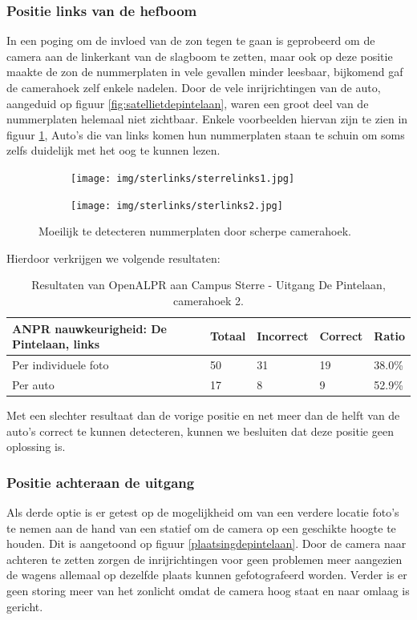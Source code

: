 \subsubsection{Positie links van de hefboom}
In een poging om de invloed van de zon tegen te gaan is geprobeerd om de camera aan de linkerkant van de slagboom te zetten, maar ook op deze positie maakte de zon de nummerplaten in vele gevallen minder leesbaar, bijkomend gaf de camerahoek zelf enkele nadelen. Door de vele inrijrichtingen van de auto, aangeduid op figuur \ref{fig:satellietdepintelaan}, waren een groot deel van de nummerplaten helemaal niet zichtbaar. Enkele voorbeelden hiervan zijn te zien in figuur \ref{fig:sterre-links}, Auto's die van links komen hun nummerplaten staan te schuin om soms zelfs duidelijk met het oog te kunnen lezen.

\begin{figure}[h!]
	\centering
	\begin{subfigure}[b]{0.4\linewidth}
		\texttt{[image: img/sterlinks/sterrelinks1.jpg]}
	\end{subfigure}
	\begin{subfigure}[b]{0.4\linewidth}
		\texttt{[image: img/sterlinks/sterlinks2.jpg]}
	\end{subfigure}
	\caption{Moeilijk te detecteren nummerplaten door scherpe camerahoek.}
	\label{fig:sterre-links}
\end{figure}

Hierdoor verkrijgen we volgende resultaten:
\begin{table}[h!]
	\centering
	\begin{tabular}{l|l|l|l|l}
		\textbf{ANPR nauwkeurigheid: De Pintelaan, links} & Totaal & Incorrect & Correct & Ratio	\\ \hline
		Per individuele foto 	& 50 & 31	& 19	& 38.0\%\\
		Per auto				& 17 & 8	& 9 	& 52.9\%\\
	\end{tabular}
\caption{Resultaten van OpenALPR aan Campus Sterre - Uitgang De Pintelaan, camerahoek 2.}
\label{tab:alprdepintelaan2}
\end{table}

Met een slechter resultaat dan de vorige positie en net meer dan de helft van de auto's correct te kunnen detecteren, kunnen we besluiten dat deze positie geen oplossing is.

\subsubsection{Positie achteraan de uitgang}
Als derde optie is er getest op de mogelijkheid om van een verdere locatie foto's te nemen aan de hand van een statief om de camera op een geschikte hoogte te houden. Dit is aangetoond op figuur \ref{plaatsingdepintelaan}. Door de camera naar achteren te zetten zorgen de inrijrichtingen voor geen problemen meer aangezien de wagens allemaal op dezelfde plaats kunnen gefotografeerd worden. Verder is er geen storing meer van het zonlicht omdat de camera hoog staat en naar omlaag is gericht.

